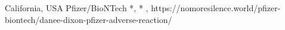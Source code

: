           {California, USA}
          {}
          {Pfizer/BioNTech}
          {*, *}
          {
            ,
          }
          {https://nomoresilence.world/pfizer-biontech/danee-dixon-pfizer-adverse-reaction/}

